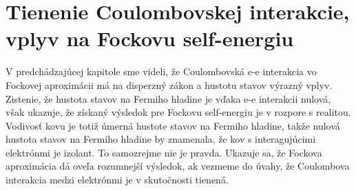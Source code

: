 \section{Tienenie Coulombovskej interakcie, vplyv na Fockovu self-energiu }


V predchádzajúcej kapitole sme videli, že Coulombovská e-e interakcia vo Fockovej aproximácii má na disperzný zákon a hustotu stavov výrazný vplyv. Zistenie, že hustota stavov na Fermiho hladine je vďaka e-e interakcii
nulová, však ukazuje, že získaný výsledok pre Fockovu self-energiu je v rozpore s realitou. Vodivosť kovu je totiž úmerná hustote stavov na Fermiho hladine, takže nulová hustota stavov na Fermiho hladine by znamenala, že kov
s interagujúcimi elektrónmi je izolant. To samozrejme nie je pravda. Ukazuje sa, že Fockova aproximácia dá oveľa rozumnejší výsledok, ak vezmeme do úvahy, že Coulombova interakcia medzi elektrónmi
je v skutočnosti tienená. 


